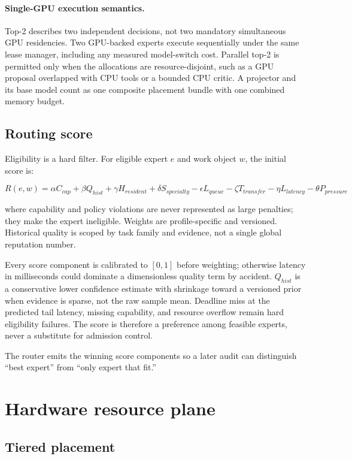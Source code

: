 \documentclass[11pt,letterpaper]{article}
\begin{document}
\paragraph{Single-GPU execution semantics.}
Top-2 describes two independent decisions, not two mandatory simultaneous GPU
residencies. Two GPU-backed experts execute sequentially under the same lease
manager, including any measured model-switch cost. Parallel top-2 is permitted
only when the allocations are resource-disjoint, such as a GPU proposal
overlapped with CPU tools or a bounded CPU critic. A projector and its base
model count as one composite placement bundle with one combined memory budget.

\subsection{Routing score}

Eligibility is a hard filter. For eligible expert \(e\) and work object \(w\),
the initial score is:

\[
R(e,w) =
\alpha C_{cap}
+ \beta Q_{hist}
+ \gamma H_{resident}
+ \delta S_{specialty}
- \epsilon L_{queue}
- \zeta T_{transfer}
- \eta L_{latency}
- \theta P_{pressure}
\]

where capability and policy violations are never represented as large
penalties; they make the expert ineligible. Weights are profile-specific and
versioned. Historical quality is scoped by task family and evidence, not a
single global reputation number.

Every score component is calibrated to \([0,1]\) before weighting; otherwise
latency in milliseconds could dominate a dimensionless quality term by accident.
\(Q_{hist}\) is a conservative lower confidence estimate with shrinkage toward a
versioned prior when evidence is sparse, not the raw sample mean. Deadline miss
at the predicted tail latency, missing capability, and resource overflow remain
hard eligibility failures. The score is therefore a preference among feasible
experts, never a substitute for admission control.

The router emits the winning score components so a later audit can distinguish
``best expert'' from ``only expert that fit.''

\section{Hardware resource plane}

\subsection{Tiered placement}
\end{document}

